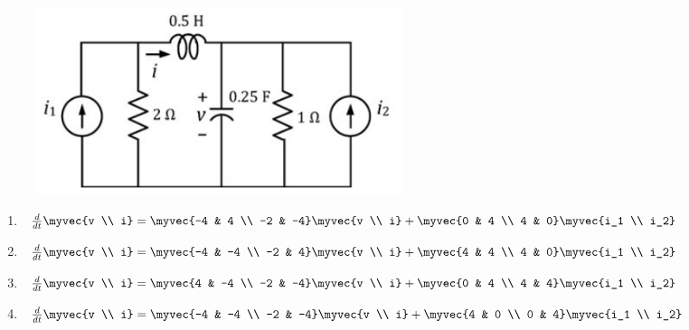     \hfill{}
    \begin{figure}[H]
        \centering
        \includegraphics[width=0.6\columnwidth]{GATE/2020/EC/figs/Q30.png}
        \caption{}
        \label{fig:q30}
    \end{figure}
    \begin{multicols}{2}
    \begin{enumerate}
        \item $\frac{d}{dt}\myvec{v \\ i} = \myvec{-4 & 4 \\ -2 & -4}\myvec{v \\ i} + \myvec{0 & 4 \\ 4 & 0}\myvec{i_1 \\ i_2}$
        \item $\frac{d}{dt}\myvec{v \\ i} = \myvec{-4 & -4 \\ -2 & 4}\myvec{v \\ i} + \myvec{4 & 4 \\ 4 & 0}\myvec{i_1 \\ i_2}$
        \item $\frac{d}{dt}\myvec{v \\ i} = \myvec{4 & -4 \\ -2 & -4}\myvec{v \\ i} + \myvec{0 & 4 \\ 4 & 4}\myvec{i_1 \\ i_2}$
        \item $\frac{d}{dt}\myvec{v \\ i} = \myvec{-4 & -4 \\ -2 & -4}\myvec{v \\ i} + \myvec{4 & 0 \\ 0 & 4}\myvec{i_1 \\ i_2}$
    \end{enumerate}
\end{multicols}
    
